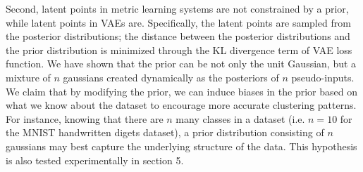 \documentclass[./dissertation.tex]{subfiles}
\begin{document}
    Second, latent points in metric learning systems are not constrained by a prior, while latent points in VAEs are. Specifically, the latent points are sampled from the posterior distributions; the distance between the posterior distributions and the prior distribution is minimized through the KL divergence term of VAE loss function. We have shown that the prior can be not only the unit Gaussian, but a mixture of $n$ gaussians created dynamically as the posteriors of $n$ pseudo-inputs. We claim that by modifying the prior, we can induce biases in the prior based on what we know about the dataset to encourage more accurate clustering patterns. For instance, knowing that there are $n$ many classes in a dataset (i.e. $n=10$ for the MNIST handwritten digets dataset), a prior distribution consisting of $n$ gaussians may best capture the underlying structure of the data. This hypothesis is also tested experimentally in section 5.

    
\end{document}
